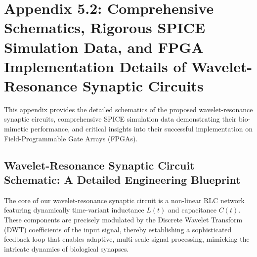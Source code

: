 \documentclass[a4paper,12pt]{article}
\begin{document}
\appendix 
\section*{Appendix 5.2: Comprehensive Schematics, Rigorous SPICE Simulation Data, and FPGA Implementation Details of Wavelet-Resonance Synaptic Circuits}

This appendix provides the detailed schematics of the proposed wavelet-resonance synaptic circuits, comprehensive SPICE simulation data demonstrating their bio-mimetic performance, and critical insights into their successful implementation on Field-Programmable Gate Arrays (FPGAs).

\subsection{Wavelet-Resonance Synaptic Circuit Schematic: A Detailed Engineering Blueprint}

The core of our wavelet-resonance synaptic circuit is a non-linear RLC network featuring dynamically time-variant inductance $L(t)$ and capacitance $C(t)$. These components are precisely modulated by the Discrete Wavelet Transform (DWT) coefficients of the input signal, thereby establishing a sophisticated feedback loop that enables adaptive, multi-scale signal processing, mimicking the intricate dynamics of biological synapses.
\end{document}
